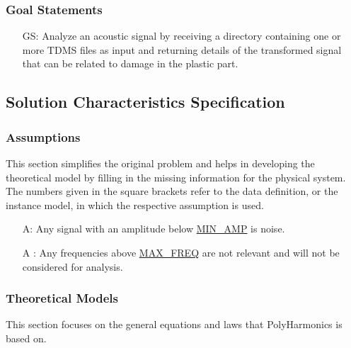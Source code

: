 \documentclass[12pt]{article}
\newcounter{assumpnum} %
\newcounter{goalnum} %
\newcommand{\progname}{PolyHarmonics}
\begin{document}
\subsubsection{Goal Statements}

\begin{itemize}
\item[GS\refstepcounter{goalnum}\thegoalnum:] Analyze an acoustic signal by 
receiving a directory containing one or more TDMS files as input and returning
details of the transformed signal that can be related to damage in the
 plastic part.
\end{itemize}

\subsection{Solution Characteristics Specification}

\subsubsection{Assumptions} \label{Assumptions}

This section simplifies the original problem and helps in developing the
theoretical model by filling in the missing information for the physical
system. The numbers given in the square brackets refer to the data definition,
or the instance model, in which the respective assumption is used.

\begin{itemize}

\item[A\refstepcounter{assumpnum}\theassumpnum \label{A_MinVolt}:] Any signal
  with an amplitude below \hyperref[AppendA]{MIN\_AMP} is noise. 
\item[A\refstepcounter{assumpnum}\theassumpnum
\label{A_MaxFreq}:]Any frequencies above \hyperref[AppendA]{MAX\_FREQ} are not
relevant and will not be considered for analysis.

\end{itemize}

\subsubsection{Theoretical Models}\label{sec_theoretical}

This section focuses on the general equations and laws that \progname{} is based
on.
~\newline
\end{document}
